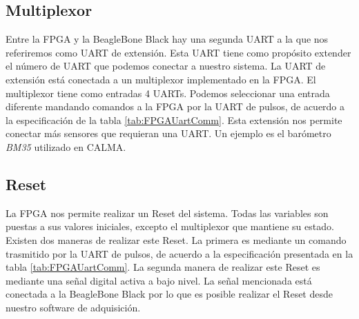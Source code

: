 	\subsection{Multiplexor}
		Entre la FPGA y la BeagleBone Black hay una segunda UART a la que nos referiremos como UART de extensión. Esta UART tiene como propósito
		extender el número de UART que podemos conectar a nuestro sistema. La UART de extensión está conectada a un multiplexor implementado en la
		FPGA. El multiplexor tiene como entradas 4 UARTs. Podemos seleccionar una entrada diferente mandando comandos a la FPGA por la UART de pulsos,
		de acuerdo a la especificación de la tabla \ref{tab:FPGAUartComm}. Esta extensión nos permite conectar más sensores que requieran una UART.
		Un ejemplo es el barómetro \emph{BM35}\cite{BM35} utilizado en CALMA.
	\subsection{Reset}
		La FPGA nos permite realizar un Reset del sistema. Todas las variables son puestas a sus valores iniciales, excepto el multiplexor que mantiene
		su estado. Existen dos maneras de realizar este Reset. La primera es mediante un comando trasmitido por la UART de  pulsos, de acuerdo a la
		especificación presentada en la tabla \ref{tab:FPGAUartComm}. La segunda manera de realizar este Reset es mediante una señal digital activa a
		bajo nivel. La señal mencionada está conectada a la BeagleBone Black por lo que es posible realizar el Reset desde nuestro software de adquisición. 
